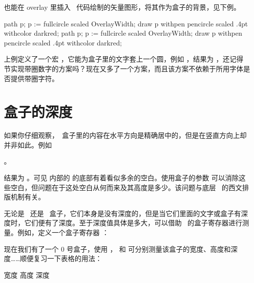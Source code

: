 \blank

也能在 overlay 里插入 \METAPOST\ 代码绘制的矢量图形，将其作为盒子的背景，见下例。

\starttyping[option=TEX]
path p;
p := fullcircle scaled OverlayWidth;
draw p withpen pencircle scaled .4pt withcolor darkred;
\stopuseMPgraphic
{}
\def\fooframe#1{%
  \inframed[frame=off,background=circle]{#1}%
}
\stoptyping
{}
path p;
p := fullcircle scaled OverlayWidth;
draw p withpen pencircle scaled .4pt withcolor darkred;
\stopuseMPgraphic
{}
\def\fooframe#1{%
  \inframed[frame=off,background=circle]{#1}%
}

上例定义了一个宏 ，它能为盒子里的文字套上一个圆，例如 \type{\fooframe{123}}，结果为 \fooframe{12345}，还记得 \in[lua] 节实现带圈数字的方案吗？现在又多了一个方案，而且该方案不依赖于所用字体是否提供带圈字符。

\section{盒子的深度}

如果你仔细观察，\CONTEXT\ 盒子里的内容在水平方向是精确居中的，但是在竖直方向上却并非如此。例如

\starttyping[option=TEX]
。
\stoptyping

\noindent 结果为 。可见 \type{\inframed} 内部的 \type{\framed} 的底部有着看似多余的空白。使用盒子的参数  可以消除这些空白，但问题在于这处空白从何而来及其高度是多少。该问题与底层 \TEX\ 的西文排版机制有关。

无论是 \TEX\ 还是 \CONTEXT\ 盒子，它们本身是没有深度的，但是当它们里面的文字或盒子有深度时，它们便有了深度。至于深度值具体是多大，可以借助 \TEX\ 的盒子寄存器进行测量。例如，定义一个盒子寄存器 ：

\starttyping[option=TEX]
\hbox{}
\stoptyping
{}\hbox{}

\noindent 现在我们有了一个 0 号盒子，使用 \type{\wd}，\type{\ht} 和 \type{\dp} 可分别测量该盒子的宽度、高度和深度……顺便复习一下表格的用法：

\startexample
\starttabulate[|c|c|c|]
\TL[3]
\NC 宽度 \NC 高度 \NC 深度 \NR
\HL
\NC \the{} \NC \the{} \NC \the{} \NR
\BL[3]
\stoptabulate
\stopexample
\simpleexample[option=TEX]{\getexample}

